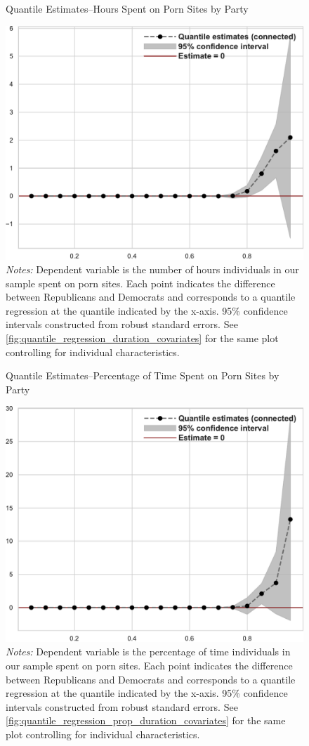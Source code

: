 \documentclass[12pt, letterpaper]{article}
\begin{document}
\begin{figure}[ht]
\centering
\caption{Quantile Estimates--Hours Spent on Porn Sites by Party}
\includegraphics[width=.6\linewidth]{../figs/quantile_reg_duration_adult.pdf}
	\caption*{\footnotesize \emph{Notes:} 
		Dependent variable is the number of hours individuals in our sample spent on porn sites.
		Each point indicates the difference between Republicans and Democrats and corresponds to a quantile regression at the quantile indicated by the x-axis.
		95\% confidence intervals constructed from robust standard errors.
		See \cref{fig:quantile_regression_duration_covariates} for the same plot controlling for individual characteristics.
}
\label{fig:quantile_regression_duration}
\end{figure}

\begin{figure}[ht]
	\centering
	\caption{Quantile Estimates--Percentage of Time Spent on Porn Sites by Party}
	\includegraphics[width=.6\linewidth]{../figs/quantile_reg_proportion_duration_adult.pdf}
	\caption*{\footnotesize \emph{Notes:} 
		Dependent variable is the percentage of time individuals in our sample spent on porn sites.
		Each point indicates the difference between Republicans and Democrats and corresponds to a quantile regression at the quantile indicated by the x-axis.
		95\% confidence intervals constructed from robust standard errors.
		See \cref{fig:quantile_regression_prop_duration_covariates} for the same plot controlling for individual characteristics.
	}
	\label{fig:quantile_regression_prop_duration}
\end{figure}
\end{document}
